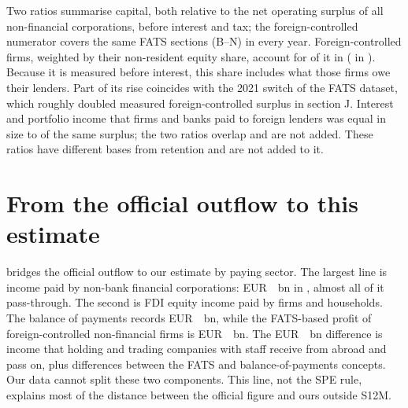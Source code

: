 \documentclass[11pt]{article}
\newcommand{\EUR}{EUR~}
\begin{document}
Two ratios summarise capital, both relative to the net operating surplus of all non-financial corporations, before interest and tax; the foreign-controlled numerator covers the same FATS sections (B--N) in every year.
Foreign-controlled firms, weighted by their non-resident equity share, account for \FOCLast{} of it in \LastYear{} (\FOCFirst{} in \FirstYear).
Because it is measured before interest, this share includes what those firms owe their lenders.
Part of its rise coincides with the 2021 switch of the FATS dataset, which roughly doubled measured foreign-controlled surplus in section J.
Interest and portfolio income that firms and banks paid to foreign lenders was equal in size to \FCredLast{} of the same surplus; the two ratios overlap and are not added.
These ratios have different bases from retention and are not added to it.

\section{From the official outflow to this estimate}
\label{sec:bridge}



 bridges the official outflow to our estimate by paying sector.
The largest line is income paid by non-bank financial corporations: \EUR\BridgeSpeLast~bn in \LastYear, almost all of it pass-through.
The second is FDI equity income paid by firms and households.
The balance of payments records \EUR\BridgeFdiEqOfficialLast~bn, while the FATS-based profit of foreign-controlled non-financial firms is \EUR\BridgeFdiEqModelLast~bn.
The \EUR\BridgeFdiEqGapLast~bn difference is income that holding and trading companies with staff receive from abroad and pass on, plus differences between the FATS and balance-of-payments concepts.
Our data cannot split these two components.
This line, not the SPE rule, explains most of the distance between the official figure and ours outside S12M.
\end{document}
